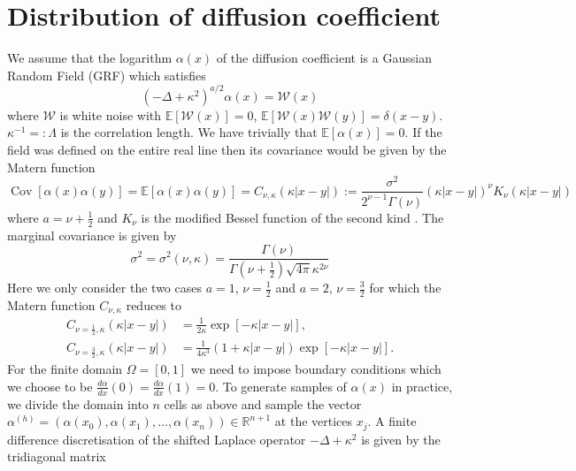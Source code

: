 \documentclass[11pt]{article}
\begin{document}
\section{Distribution of diffusion coefficient}
We assume that the logarithm $\alpha(x)$ of the diffusion coefficient is a Gaussian Random Field (GRF) which satisfies
\begin{equation}
    (-\Delta + \kappa^2)^{a/2}\alpha(x) = \mathcal{W}(x)
\end{equation}
where $\mathcal{W}$ is white noise with $\mathbb{E}[\mathcal{W}(x)]=0$, $\mathbb{E}[\mathcal{W}(x)\mathcal{W}(y)] = \delta(x-y)$. $\kappa^{-1}=:\Lambda$ is the correlation length. We have trivially that $\mathbb{E}[\alpha(x)]=0$. If the field was defined on the entire real line then its covariance would be given by the Matern function
\begin{equation}
    \operatorname{Cov}[\alpha(x)\alpha(y)]=\mathbb{E}[\alpha(x)\alpha(y)] = C_{\nu,\kappa}(\kappa |x-y|):=\frac{\sigma^2}{2^{\nu-1}\Gamma(\nu)}\left(\kappa |x-y|\right)^\nu K_\nu(\kappa|x-y|) 
\end{equation}
where $a = \nu+\frac{1}{2}$ and $K_\nu$ is the modified Bessel function of the second kind \cite{lindgren2011explicit}.
The marginal covariance is given by
\begin{equation}
    \sigma^2 = \sigma^2(\nu,\kappa) = \frac{\Gamma(\nu)}{\Gamma(\nu+\frac{1}{2})\sqrt{4\pi}\kappa^{2\nu}}
\end{equation}
Here we only consider the two cases $a=1$, $\nu=\frac{1}{2}$ and $a=2$, $\nu=\frac{3}{2}$ for which the Matern function $C_{\nu,\kappa}$ reduces to 
\begin{equation}
\begin{aligned}
        C_{\nu=\frac{1}{2},\kappa}(\kappa|x-y|) &= \frac{1}{2\kappa}\exp[-\kappa|x-y|],\\
        C_{\nu=\frac{3}{2},\kappa}(\kappa|x-y|) &= \frac{1}{4\kappa^3}\left(1+\kappa|x-y|\right)\exp[-\kappa|x-y|].
\end{aligned}
\end{equation}
For the finite domain $\Omega=[0,1]$ we need to impose boundary conditions which we choose to be $\frac{d\alpha}{dx}(0)=\frac{d\alpha}{dx}(1)=0$. To generate samples of $\alpha(x)$ in practice, we divide the domain into $n$ cells as above and sample the vector $\alpha^{(h)}=(\alpha(x_0),\alpha(x_1),\dots,\alpha(x_n))\in\mathbb{R}^{n+1}$ at the vertices $x_j$. A finite difference discretisation of the shifted Laplace operator $-\Delta + \kappa^2$ is given by the tridiagonal matrix
\end{document}
